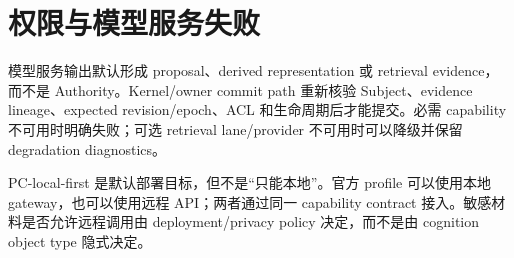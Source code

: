 \section{权限与模型服务失败}

模型服务输出默认形成 proposal、derived representation 或 retrieval evidence，而不是 Authority。Kernel/owner commit path 重新核验 Subject、evidence lineage、expected revision/epoch、ACL 和生命周期后才能提交。必需 capability 不可用时明确失败；可选 retrieval lane/provider 不可用时可以降级并保留 degradation diagnostics。

PC-local-first 是默认部署目标，但不是“只能本地”。官方 profile 可以使用本地 gateway，也可以使用远程 API；两者通过同一 capability contract 接入。敏感材料是否允许远程调用由 deployment/privacy policy 决定，而不是由 cognition object type 隐式决定。
